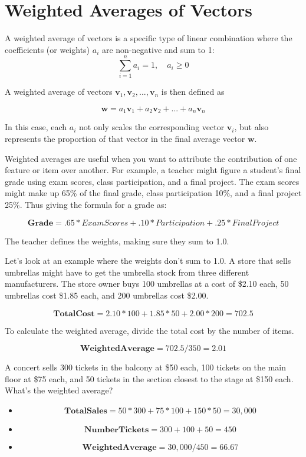 \section{Weighted Averages of Vectors}
A weighted average of vectors is a specific type of linear combination
where the coefficients (or weights) $a_i$ are non-negative and sum to
1:
\[
\sum_{i=1}^{n} a_i = 1, \quad a_i \geq 0
\]

A weighted average of vectors $\mathbf{v}_1, \mathbf{v}_2, ...,
\mathbf{v}_n$ is then defined as

\[
\mathbf{w} = a_1\mathbf{v}_1 + a_2\mathbf{v}_2 + ... + a_n\mathbf{v}_n
\]

In this case, each $a_i$ not only scales the corresponding vector
$\mathbf{v}_i$, but also represents the proportion of that vector in
the final average vector $\mathbf{w}$.

Weighted averages are useful when you want to attribute the contribution of one feature or item over another. For example, a teacher might figure a student's final grade using exam scores, class participation, and a final project. The exam scores might make up 65\% of the final grade, class participation 10\%, and a final project 25\%. Thus giving the formula for a grade as:

\[
\mathbf{Grade} = .65*ExamScores + .10*Participation + .25*FinalProject
\]

The teacher defines the weights, making sure they sum to 1.0. 

Let's look at an example where the weights don't sum to 1.0. A store that sells umbrellas might have to get the umbrella stock from three different manufacturers. The store owner buys 100 umbrellas at a cost of \$2.10 each, 50 umbrellas cost \$1.85 each, and 200 umbrellas cost \$2.00. 

\[
\mathbf{TotalCost} = 2.10*100 + 1.85*50 + 2.00*200 = 702.5
\]

To calculate the weighted average, divide the total cost by the number of items.

\[
\mathbf{WeightedAverage} = 702.5/350 = 2.01 
\]

\begin{Exercise}[title={Weighted Average}, label=weighted_average]
  A concert sells 300 tickets in the balcony at \$50 each, 100 tickets on the main floor at \$75 each, and 50 tickets in the section closest to the stage at \$150 each. What's the weighted average?
\end{Exercise}
\begin{Answer}[ref=weighted_average]
 \begin{itemize}
    \item\[\mathbf{TotalSales} = 50*300 + 75*100 + 150*50 = 30,000\]
	\item\[\mathbf{NumberTickets} = 300 + 100 + 50 = 450\]
	\item\[\mathbf{WeightedAverage} = 30,000/450 = 66.67\]
 \end{itemize} 
\end{Answer}

